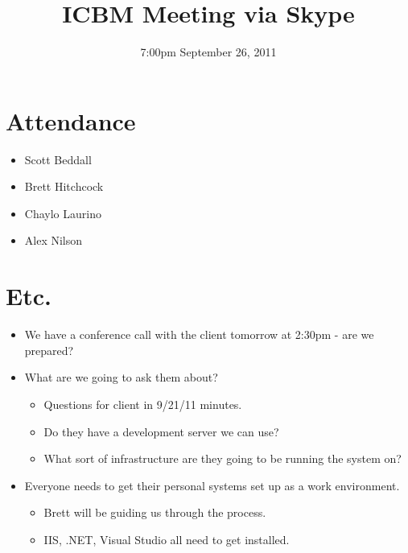 \documentclass{article}
\begin{document}
\title{ICBM Meeting via Skype}
\date{7:00pm September 26, 2011}
\maketitle

\section{Attendance}
\begin{itemize}
\item Scott Beddall
\item Brett Hitchcock
\item Chaylo Laurino
\item Alex Nilson
\end{itemize}

\section{Etc.}
\begin{itemize}
\item We have a conference call with the client tomorrow at 2:30pm - are we prepared?
\item What are we going to ask them about?
	\begin{itemize}
	\item Questions for client in 9/21/11 minutes.
	\item Do they have a development server we can use?
	\item What sort of infrastructure are they going to be running the system on?
	\end{itemize}
\item Everyone needs to get their personal systems set up as a work environment.
	\begin{itemize}
	\item Brett will be guiding us through the process.
	\item IIS, .NET, Visual Studio all need to get installed.
	\end{itemize}
\end{itemize}
\end{document}
